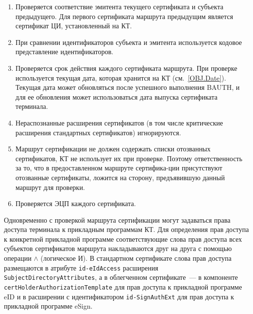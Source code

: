 \begin{enumerate}
\item
Проверяется соответствие эмитента текущего сертификата и субъекта 
предыдущего. Для первого сертификата маршрута предыдущим является 
сертификат ЦИ, установленный на КТ. 

\item
При сравнении идентификаторов субъекта и эмитента используется кодовое 
представление идентификаторов. 

\item
Проверяется срок действия каждого сертификата маршрута. При проверке 
используется текущая дата, которая хранится на КТ (см.~\ref{OBJ.Date}). 
Текущая дата может обновляться после успешного выполнения BAUTH, и для ее 
обновления может использоваться дата выпуска сертификата терминала. 

\item
Нераспознанные расширения сертификатов (в том числе критические 
расширения стандартных сертификатов) игнорируются. 

\item
Маршрут сертификации не должен содержать списки отозванных сертификатов, 
КТ не использует их при проверке. Поэтому ответственность за то, что в 
предоставленном маршруте сертифика-ции присутствуют отозванные 
сертификаты, ложится на сторону, предъявившую данный маршрут для проверки. 

\item
Проверяется ЭЦП каждого сертификата.
\end{enumerate}

Одновременно с проверкой маршрута сертификации могут задаваться права 
доступа терминала к прикладным программам КТ.
Для определения прав доступа к конкретной 
прикладной программе соответствующие слова прав доступа 
всех субъектов сертификатов маршрута накладываются друг на 
друга с помощью операции $\wedge$ (логическое И). 
В стандартном сертификате слова прав доступа размещаются в 
атрибуте \verb|id-eIdAccess| расширения \verb|SubjectDirectoryAttributes|, 
а в облегченном сертификате~--- в компоненте 
\verb|certHolderAuthorizationTemplate| для прав доступа к прикладной
программе eID и в расширении с идентификатором
\verb|id-SignAuthExt| для прав доступа к прикладной
программе eSign.



